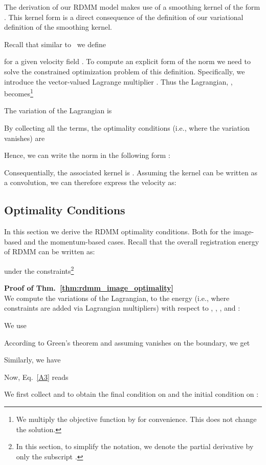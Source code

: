 \documentclass{article}
\numberwithin{equation}{section}
\newcommand{\ie}{{i.e.}}
\begin{document}
The derivation of our RDMM model makes use of a smoothing kernel of the form . This kernel form is a direct consequence of the definition of our variational definition of the smoothing kernel. 

Recall that similar to~\citep{niethammer2019_cvpr} we define

for a given velocity field . To compute an explicit form of the norm  we need to solve the constrained optimization problem of this definition. Specifically, we introduce the vector-valued Lagrange multiplier . Thus the Lagrangian, , becomes\footnote{We multiply the objective function by  for convenience. This does not change the solution.}

The variation of the Lagrangian is

By collecting all the terms, the optimality conditions (\ie, where the variation vanishes) are 

Hence, we can write the norm  in the following form :

Consequentially, the associated kernel is . Assuming the kernel can be written as a convolution, we can therefore express the velocity as:


\subsection{Optimality Conditions}
\label{sec:optimality_conditions}

In this section we derive the RDMM optimality conditions. Both for the image-based and the momentum-based cases. Recall that the overall registration energy of RDMM can be written as:

under the constraints\footnote{In this section, to simplify the notation, we denote the partial derivative  by only the subscript .}


{\bf Proof of Thm.~\eqref{thm:rdmm_image_optimality}}\\
We compute the variations of the Lagrangian,  to the energy (i.e., where constraints are added via Lagrangian multipliers) with respect to , , ,  and :


We use 

According to Green's theorem and assuming  vanishes on the boundary, we get

Similarly, we have


Now, Eq.~\eqref{A3} reads


We first collect  and  to obtain the final condition on  and the initial condition on :
\end{document}
